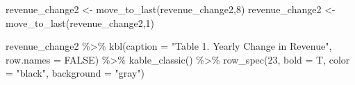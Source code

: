 \documentclass[
  letterpaper,
  DIV=11,
  numbers=noendperiod]{scrreport}
\newenvironment{Shaded}{\begin{snugshade}}{\end{snugshade}}
\newcommand{\AttributeTok}[1]{\textcolor[rgb]{0.40,0.45,0.13}{#1}}
\newcommand{\ConstantTok}[1]{\textcolor[rgb]{0.56,0.35,0.01}{#1}}
\newcommand{\DecValTok}[1]{\textcolor[rgb]{0.68,0.00,0.00}{#1}}
\newcommand{\FunctionTok}[1]{\textcolor[rgb]{0.28,0.35,0.67}{#1}}
\newcommand{\NormalTok}[1]{\textcolor[rgb]{0.00,0.23,0.31}{#1}}
\newcommand{\OtherTok}[1]{\textcolor[rgb]{0.00,0.23,0.31}{#1}}
\newcommand{\SpecialCharTok}[1]{\textcolor[rgb]{0.37,0.37,0.37}{#1}}
\newcommand{\StringTok}[1]{\textcolor[rgb]{0.13,0.47,0.30}{#1}}
\begin{document}
\begin{Shaded}
\begin{Highlighting}[]
\NormalTok{revenue\_change2 }\OtherTok{\textless{}{-}} \FunctionTok{move\_to\_last}\NormalTok{(revenue\_change2,}\DecValTok{8}\NormalTok{)}
\NormalTok{revenue\_change2 }\OtherTok{\textless{}{-}} \FunctionTok{move\_to\_last}\NormalTok{(revenue\_change2,}\DecValTok{1}\NormalTok{)}

\NormalTok{revenue\_change2 }\SpecialCharTok{\%\textgreater{}\%} 
  \FunctionTok{kbl}\NormalTok{(}\AttributeTok{caption =} \StringTok{"Table 1. Yearly Change in Revenue"}\NormalTok{, }\AttributeTok{row.names =} \ConstantTok{FALSE}\NormalTok{) }\SpecialCharTok{\%\textgreater{}\%} 
   \FunctionTok{kable\_classic}\NormalTok{() }\SpecialCharTok{\%\textgreater{}\%}
    \FunctionTok{row\_spec}\NormalTok{(}\DecValTok{23}\NormalTok{, }\AttributeTok{bold =}\NormalTok{ T, }\AttributeTok{color =} \StringTok{"black"}\NormalTok{, }\AttributeTok{background =} \StringTok{"gray"}\NormalTok{)}
\end{Highlighting}
\end{Shaded}
\end{document}
